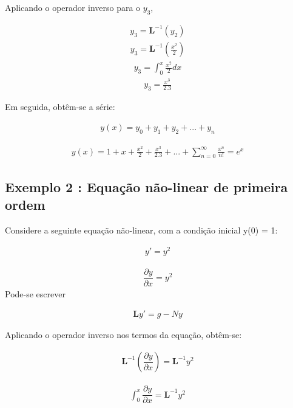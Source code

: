 Aplicando o operador inverso para o $y_{3}$,

\begin{gather*}
  y_{3} = \textbf{L}^{-1} (y_{2})
\end{gather*}
\begin{gather*}
  y_{3} = \textbf{L}^{-1}\left(\frac{x^{2}}{2}\right)
\end{gather*}
\begin{gather*}
  y_{3} =\int_0^{x}\frac{x^{2}}{2}dx
\end{gather*}
\begin{gather*}
  y_{3} = \frac{x^{3}}{2.3}
\end{gather*}


Em seguida, obtêm-se a série:

\begin{gather*}
  y(x) = y_{0} +y_{1} + y_{2} + ... + y_{n} 
\end{gather*}

\begin{gather*}
  y(x) = 1 + x + \frac{x^{2}}{2} +  \frac{x^{3}}{2.3} + ...+ \sum_{n=0}^{\infty}\frac{x^{n}}{n!} = e^{x}
\end{gather*}

\subsection{Exemplo 2 : Equação não-linear de primeira ordem}


Considere a seguinte equação não-linear, com a condição inicial y(0) = 1:

\begin{gather*}
  y' = y^{2}
\end{gather*}

\begin{gather*}
 \dfrac{\partial y}{\partial x} = y^2
 \end{gather*}
Pode-se escrever

\begin{gather*}
 \textbf{L}y' = g - Ny
  \end{gather*}
  
Aplicando o operador inverso nos termos da equação, obtêm-se:

\begin{gather*}
 \textbf{L}^{-1}\left(\dfrac{\partial y}{\partial x}\right) = \textbf{L}^{-1} y^2
  \end{gather*}
  
  \begin{gather*}
  \int_0^{x}\dfrac{\partial y}{\partial x} = \textbf{L}^{-1} y^2
\end{gather*} 

